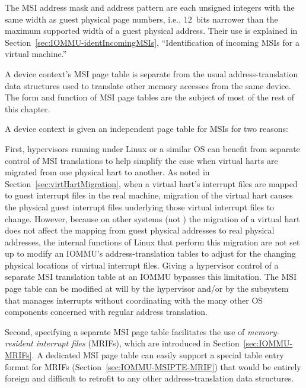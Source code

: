 The MSI address mask and address pattern are each unsigned integers
with the same width as guest physical page numbers, i.e., 12~bits
narrower than the maximum supported width of a guest physical address.
Their use is explained in Section~\ref{sec:IOMMU-identIncomingMSIs},
``Identification of incoming MSIs for a virtual machine.''

A device context's MSI page table is separate from the usual
address-translation data structures used to translate other memory
accesses from the same device.
The form and function of MSI page tables are the subject of most of the
rest of this chapter.

\begin{commentary}
A device context is given an independent page table for MSIs for two
reasons:

First, hypervisors running under Linux or a similar OS can benefit from
separate control of MSI translations to help simplify the case when
virtual harts are migrated from one physical hart to another.
As noted in Section~\ref{sec:virtHartMigration}, when a virtual
hart's interrupt files are mapped to guest interrupt files in the
real machine, migration of the virtual hart causes the physical guest
interrupt files underlying those virtual interrupt files to change.
However, because on other systems (not {\RISCV}) the migration
of a virtual hart does not affect the mapping from guest physical
addresses to real physical addresses, the internal functions of Linux
that perform this migration are not set up to modify an \mbox{IOMMU}'s
address-translation tables to adjust for the changing physical
locations of {\RISCV} virtual interrupt files.
Giving a hypervisor control of a separate MSI translation table at an
\mbox{IOMMU} bypasses this limitation.
The MSI page table can be modified at will by the hypervisor and/or
by the subsystem that manages interrupts without coordinating with the
many other OS components concerned with regular address translation.

Second, specifying a separate MSI page table facilitates the use of
\emph{memory-resident interrupt files} (MRIFs), which are introduced in
Section~\ref{sec:IOMMU-MRIFs}.
A dedicated MSI page table can easily support a special table
entry format for MRIFs (Section~\ref{sec:IOMMU-MSIPTE-MRIF}) that
would be entirely foreign and difficult to retrofit to any other
address-translation data structures.
\end{commentary}

